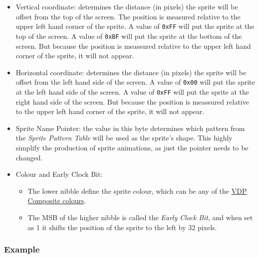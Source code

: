     \begin{itemize}
        \item Vertical coordinate: determines the distance (in pixels) the
                sprite will be offset from the top of the screen. The position
                is measured relative to the upper left hand corner of the sprite.
                A value of \texttt{0xFF} will put the sprite at the top of the
                screen. A value of \texttt{0xBF} will put the sprite at the
                bottom of the screen. But because the position is meassured
                relative to the upper left hand corner of the sprite, it will
                not appear.
        \item Horizontal coordinate: determines the distance (in pixels) the
                sprite will be offset from the left hand side of the screen. A
                value of \texttt{0x00} will put the sprite at the left hand side
                of the screen. A value of \texttt{0xFF} will put the sprite at
                the right hand side of the screen. But because the position is
                meassured relative to the upper left hand corner of the sprite,
                it will not appear.
        \item Sprite Name Pointer: the value in this byte determines which
                pattern from the \textit{Sprite Pattern Table} will be used as
                the sprite's shape. This highly simplify the production of
                sprite animations, as just the pointer needs to be changed.
        \item Colour and Early Clock Bit:
            \begin{itemize}
                \item The lower nibble define the sprite
                        colour, which can be any of the \hyperref[sec:vdp_colours]{
                        VDP Composite colours}.
                \item The MSB of the higher nibble is called the \textit{Early
                        Clock Bit}, and when set as 1 it shifts the position of
                        the sprite to the left by 32 pixels.
            \end{itemize}
    \end{itemize}

        \subsubsection{Example}

